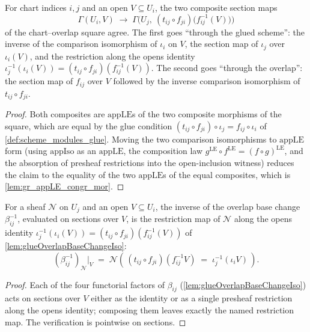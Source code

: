 \begin{lemma}\leanok
  \label{lem:gr_overlap_appIso_compat}
  For chart indices \(i, j\) and an open \(V \subseteq U_i\), the two composite
  section maps
  \[
    \Gamma(U_i, V)\;\longrightarrow\;
      \Gamma\bigl(U_j,\ (t_{ij}\circ f_{ji})\bigl(f_{ij}^{-1}(V)\bigr)\bigr)
  \]
  of the chart--overlap square agree. The first goes ``through the glued scheme'':
  the inverse of the comparison isomorphism of \(\iota_i\) on \(V\), the section map of
  \(\iota_j\) over \(\iota_i(V)\), and the restriction along the opens identity
  \(\iota_j^{-1}(\iota_i(V)) = (t_{ij}\circ f_{ji})(f_{ij}^{-1}(V))\). The second goes
  ``through the overlap'': the section map of \(f_{ij}\) over \(V\) followed by the
  inverse comparison isomorphism of \(t_{ij}\circ f_{ji}\).
\end{lemma}
\begin{proof}
  \leanok
  Both composites are \(\mathrm{appLE}\)s of the two composite morphisms of the square,
  which are equal by the glue condition \((t_{ij}\circ f_{ji})\circ \iota_j =
  f_{ij}\circ \iota_i\) of \cref{def:scheme_modules_glue}. Moving the two comparison
  isomorphisms to \(\mathrm{appLE}\) form (using \(\mathrm{appIso}\) as an
  \(\mathrm{appLE}\), the composition law \(g^{\mathrm{LE}}\circ f^{\mathrm{LE}} =
  (f\circ g)^{\mathrm{LE}}\), and the absorption of presheaf restrictions into the
  open-inclusion witness) reduces the claim to the equality of the two
  \(\mathrm{appLE}\)s of the equal composites, which is \cref{lem:gr_appLE_congr_mor}.
\end{proof}

\begin{lemma}\leanok
  \label{lem:gr_overlapBaseChange_inv_app}
  For a sheaf \(\mathcal{N}\) on \(U_j\) and an open \(V \subseteq U_i\), the inverse
  of the overlap base change \(\beta_{ij}^{-1}\), evaluated on sections over \(V\), is
  the restriction map of \(\mathcal{N}\) along the opens identity
  \(\iota_j^{-1}(\iota_i(V)) = (t_{ij}\circ f_{ji})(f_{ij}^{-1}(V))\) of
  \cref{lem:glueOverlapBaseChangeIso}:
  \[
    (\beta_{ij}^{-1})_{\mathcal{N}}\big|_V
      \;=\;
    \mathcal{N}\!\left(\,(t_{ij}\circ f_{ji})(f_{ij}^{-1}V) \;=\; \iota_j^{-1}(\iota_i V)\,\right).
  \]
\end{lemma}
\begin{proof}
  \leanok
  Each of the four functorial factors of \(\beta_{ij}\) (\cref{lem:glueOverlapBaseChangeIso})
  acts on sections over \(V\) either as the identity or as a single presheaf
  restriction along the opens identity; composing them leaves exactly the named
  restriction map. The verification is pointwise on sections.
\end{proof}

